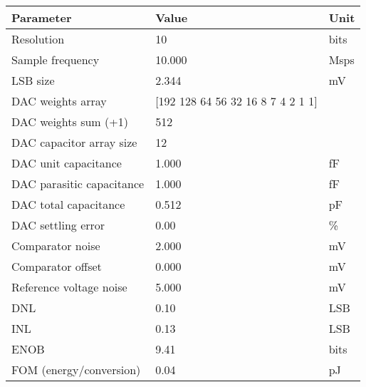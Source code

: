 \begin{tabular}{lll}
\toprule
Parameter & Value & Unit \\
\midrule
Resolution & 10 & bits \\
Sample frequency & 10.000 & Msps \\
LSB size & 2.344 & mV \\
DAC weights array & [192 128  64  56  32  16   8   7   4   2   1   1] &  \\
DAC weights sum (+1) & 512 &  \\
DAC capacitor array size & 12 &  \\
DAC unit capacitance & 1.000 & fF \\
DAC parasitic capacitance & 1.000 & fF \\
DAC total capacitance & 0.512 & pF \\
DAC settling error & 0.00 & \% \\
Comparator noise & 2.000 & mV \\
Comparator offset & 0.000 & mV \\
Reference voltage noise & 5.000 & mV \\
DNL & 0.10 & LSB \\
INL & 0.13 & LSB \\
ENOB & 9.41 & bits \\
FOM (energy/conversion) & 0.04 & pJ \\
\bottomrule
\end{tabular}
